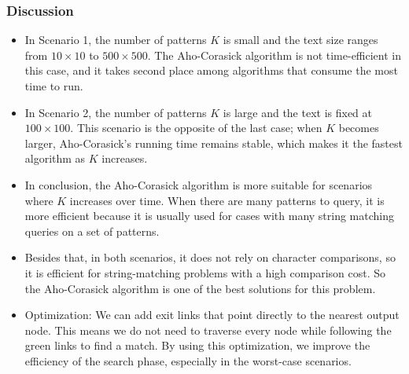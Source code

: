     \subsubsection{Discussion}
    \begin{itemize}
        \item In Scenario 1, the number of patterns $K$ is small and the text size ranges from $10 \times 10$ to $500 \times 500$. 
        The Aho-Corasick algorithm is not time-efficient in this case, and it takes second place among algorithms that consume the most time to run.
        \item In Scenario 2, the number of patterns $K$ is large and the text is fixed at $100 \times 100$. 
        This scenario is the opposite of the last case; when $K$ becomes larger, Aho-Corasick's running time remains stable, which makes it the fastest algorithm as $K$ increases.
        \item In conclusion, the Aho-Corasick algorithm is more suitable for scenarios where $K$ increases over time. 
        When there are many patterns to query, it is more efficient because it is usually used for cases with many string matching queries on a set of patterns.
        \item Besides that, in both scenarios, it does not rely on character comparisons, so it is efficient for string-matching problems with a high comparison cost.
        So the Aho-Corasick algorithm is one of the best solutions for this problem.
        \item Optimization: We can add exit links that point directly to the nearest output node. 
        This means we do not need to traverse every node while following the green links to find a match. 
        By using this optimization, we improve the efficiency of the search phase, especially in the worst-case scenarios.
    \end{itemize}
        